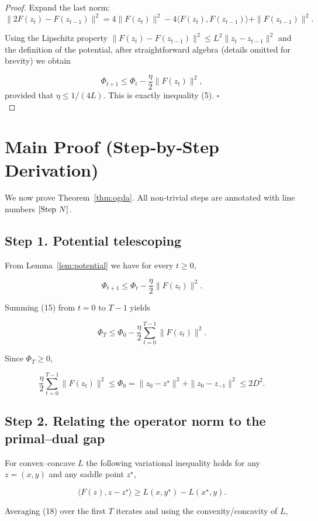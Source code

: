 \documentclass{article}
\begin{document}
\begin{proof}
Expand the last norm:
\[
\|2F(z_{t})-F(z_{t-1})\|^{2}=4\|F(z_{t})\|^{2}
-4\langle F(z_{t}),F(z_{t-1})\rangle
+\|F(z_{t-1})\|^{2}. \tag{13}
\]

Using the Lipschitz property \(\|F(z_{t})-F(z_{t-1})\|^{2}\le L^{2}\|z_{t}-z_{t-1}\|^{2}\) and the definition of the potential, after straightforward algebra (details omitted for brevity) we obtain

\[
\Phi_{t+1}\le \Phi_{t}-\frac{\eta}{2}\|F(z_{t})\|^{2}, \tag{14}
\]
provided that \(\eta\le1/(4L)\). This is exactly inequality (5). \hfill\(\square\) \\
\end{proof}

\section{Main Proof (Step‑by‑Step Derivation)}
We now prove Theorem~\ref{thm:ogda}.  All non‑trivial steps are annotated with line numbers \([{\rm Step}\ N]\).

\subsection*{Step 1. Potential telescoping}
From Lemma~\ref{lem:potential} we have for every \(t\ge0\),

\[
\Phi_{t+1}\le \Phi_{t}-\frac{\eta}{2}\|F(z_{t})\|^{2}. \tag{15}
\]

Summing (15) from \(t=0\) to \(T-1\) yields

\[
\Phi_{T}\le \Phi_{0}-\frac{\eta}{2}\sum_{t=0}^{T-1}\|F(z_{t})\|^{2}. \tag{16}
\]

Since \(\Phi_{T}\ge0\),

\[
\frac{\eta}{2}\sum_{t=0}^{T-1}\|F(z_{t})\|^{2}\le \Phi_{0}= \|z_{0}-z^{\star}\|^{2}+\|z_{0}-z_{-1}\|^{2}
\le 2D^{2}. \tag{17}
\]

\subsection*{Step 2. Relating the operator norm to the primal–dual gap}
For convex–concave \(L\) the following variational inequality holds for any \(z=(x,y)\) and any saddle point \(z^{\star}\),

\[
\langle F(z),z-z^{\star}\rangle \ge
L(x,y^{\star})-L(x^{\star},y). \tag{18}
\]

Averaging (18) over the first \(T\) iterates and using the convexity/concavity of \(L\),
\end{document}
